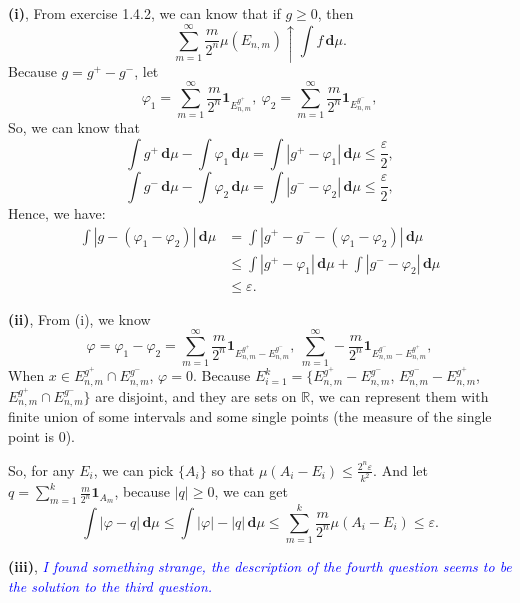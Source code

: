 \documentclass[en, normal, 11pt, black]{elegantnote}
\newenvironment{solution}{\begin{tcolorbox}[colback=white, colframe=black!50, breakable, title=Solution. ]\setlength{\parskip}{0.8em}}{\end{tcolorbox}}
\newcommand{\der}{\,\mathbf{d}}
\begin{document}
    \begin{solution}
        {\large\bf(i)}, From exercise 1.4.2, we can know that if $g\geqslant0$, then 
        \[
            \sum_{m=1}^{\infty} \frac{m}{2^{n}} \mu\left(E_{n, m}\right) \uparrow \int f \der \mu. 
        \]
        Because $g=g^+-g^-$, let 
        \[
            \varphi_1=\sum_{m=1}^\infty\frac{m}{2^n}\mathbf{1}_{E_{n,m}^{g^+}},\ \varphi_2=\sum_{m=1}^\infty\frac{m}{2^n}\mathbf{1}_{E_{n,m}^{g^-}}, 
        \]
        So, we can know that 
        \[\int g^+\der\mu-\int \varphi_1\der\mu=\int|g^+-\varphi_1|\der\mu\leqslant\frac{\varepsilon}{2}, \]
        \[\int g^-\der\mu-\int \varphi_2\der\mu=\int|g^--\varphi_2|\der\mu\leqslant\frac{\varepsilon}{2}, \]
        Hence, we have: 
        \begin{align*}
            \int |g-(\varphi_1-\varphi_2)|\der \mu&=\int |g^+-g^--(\varphi_1-\varphi_2)|\der \mu\\
            &\leqslant\int|g^+-\varphi_1|\der \mu + \int |g^--\varphi_2|\der \mu\\
            &\leqslant\varepsilon. 
        \end{align*}

        {\large\bf(ii)}, 
        From (i), we know 
        \[
            \varphi=\varphi_1-\varphi_2=\sum_{m=1}^\infty\frac{m}{2^n}\mathbf{1}_{E_{n,m}^{g^+}-E_{n,m}^{g^-}},\ \sum_{m=1}^\infty-\frac{m}{2^n}\mathbf{1}_{E_{n,m}^{g^-}-E_{n,m}^{g^+}}, 
        \]
        When $x\in E_{n,m}^{g^+}\cap E_{n,m}^{g^-}$, $\varphi=0$. Because $E_{i=1}^k=\{E_{n,m}^{g^+}-E_{n,m}^{g^-}$, $E_{n,m}^{g^-}-E_{n,m}^{g^+}$, $E_{n,m}^{g^+}\cap E_{n,m}^{g^-}\}$ are disjoint, and they are sets on $\mathbb{R}$, we can represent them with finite union of some intervals and some single points (the measure of the single point is $0$). 
        
        So, for any $E_i$, we can pick $\{A_i\}$ so that $\mu(A_i-E_i)\leqslant\frac{2^n\varepsilon}{k^2}$. And let $q=\sum_{m=1}^k\frac{m}{2^n}\mathbf{1}_{A_m}$, because $|q|\geqslant0$, we can get 
        \[\int|\varphi-q|\der\mu\leqslant\int|\varphi|-|q|\der\mu\leqslant\sum_{m=1}^k\frac{m}{2^{n}}\mu(A_i-E_i)\leqslant\varepsilon. \]

        {\large\bf(iii)}, \textcolor{blue}{\emph{I found something strange, the description of the fourth question seems to be the solution to the third question. }}
    \end{solution}
    
\end{document}
